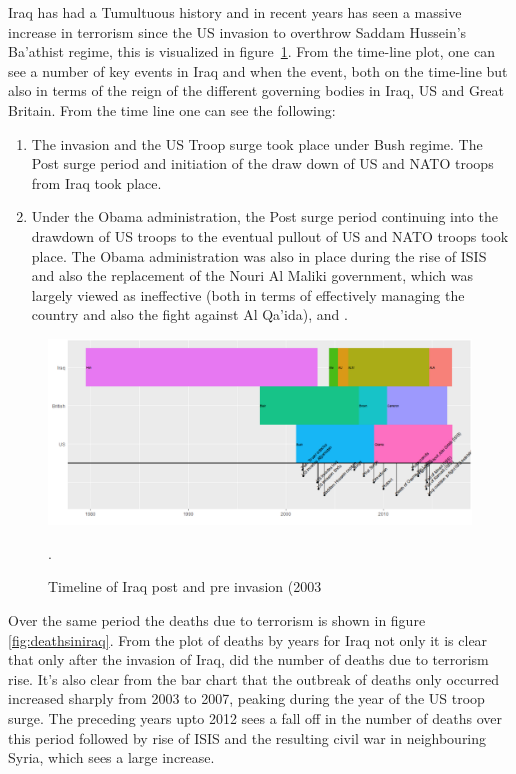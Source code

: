 Iraq has had a Tumultuous history and in recent years has seen a massive increase in terrorism since the US invasion to overthrow Saddam Hussein's Ba'athist regime, this is visualized in figure~\ref{fig:timelineiraq}. From the time-line plot, one can see a number of key events in Iraq and when the event, both on the time-line but also in terms of the reign of the different governing bodies in Iraq, US and Great Britain. From the time line one can see the following:
\begin{enumerate}
\item The invasion and the US Troop surge took place under Bush regime. The Post surge period and initiation of the draw down of US and NATO troops from Iraq took place.  
\item  Under the Obama administration, the Post surge period continuing into the drawdown of US troops to the eventual pullout of US and NATO troops took place. The Obama administration was also in place during the rise of ISIS and also the replacement of the Nouri Al Maliki government, which was largely viewed as ineffective (both in terms of effectively managing the country and also the fight against Al Qa'ida), \citep{simon2008price} and \citep{kuoti2016exclusion}.
\end{enumerate}

\begin{figure}[t]
\includegraphics[width=15cm]{Peters_experiment_markdown_files/figure-latex/CaptureTimelineIraq.png}
\caption{Timeline of Iraq post and pre invasion (2003}.
\label{fig:timelineiraq}
\centering
\end{figure}

Over the same period the deaths due to terrorism is shown in figure~ \ref{fig:deathsiniraq}. From the plot of deaths by years for Iraq not only it is clear that only after the invasion of Iraq, did the number of deaths due to terrorism rise. It's also clear from the bar chart that the outbreak of deaths only occurred increased sharply from 2003 to 2007, peaking during the year of the US troop surge.  The preceding years upto 2012 sees a fall off in the number of deaths over this period followed by rise of ISIS \citep{sekulow2015rise} and the resulting civil war in neighbouring Syria, which sees a large increase. 

